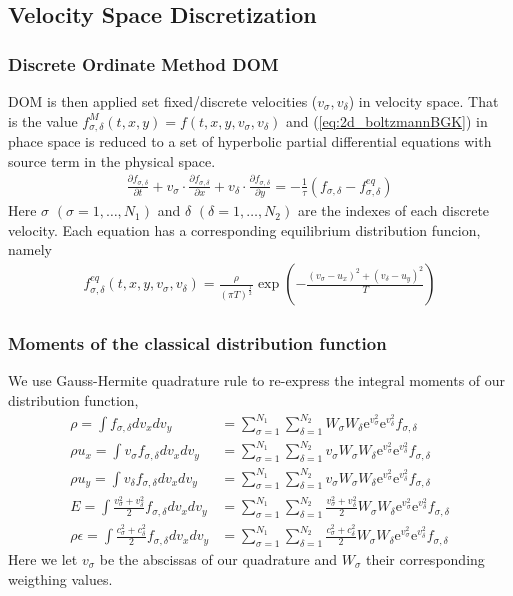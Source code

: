 \subsection{Velocity Space Discretization}
\begin{frame} \frametitle{Discrete Ordinate Method DOM}
	DOM is then applied set fixed/discrete velocities ($v_\sigma,v_\delta$) in velocity space. That is the value $f_{\sigma,\delta}^{M}(t,x,y) = f(t,x,y,v_\sigma,v_\delta)$ and (\ref{eq:2d_boltzmannBGK}) in phace space is reduced to a set of hyperbolic partial differential equations with source term in the physical space.
	\begin{align}
		\frac{\partial{f_{\sigma,\delta}}}{\partial{t}} +
		v_{\sigma}\cdot\frac{\partial{f_{\sigma,\delta}}}{\partial x} +
		v_{\delta}\cdot\frac{\partial{f_{\sigma,\delta}}}{\partial y} = 
		-\frac{1}{\tau}(f_{\sigma,\delta}-f^{eq}_{\sigma,\delta})
	\end{align}
Here $\sigma$ $(\sigma = 1,\dots,N_{1})$ and $\delta$ $(\delta = 1,\dots,N_{2})$ are the indexes of each discrete velocity. Each equation has a corresponding equilibrium distribution funcion, namely
	\begin{align}
		f_{\sigma,\delta}^{eq}(t,x,y,v_\sigma,v_\delta) = 
		\frac{\rho}{(\pi T)^{\frac{1}{2}}} \exp\left({-\frac{(v_{\sigma}-u_x)^2+(v_{\delta}-u_y)^2}{T}} \right)
	\end{align}
\end{frame}

\begin{frame}
	\frametitle{Moments of the classical distribution function}
	We use Gauss-Hermite quadrature rule to re-express the integral moments of our distribution function,
	\begin{subequations}
		\begin{align}
		\rho = \int f_{\sigma,\delta} dv_x dv_y 
				&= \sum_{\sigma=1}^{N_1} \sum_{\delta=1}^{N_2} W_\sigma W_\delta \mathrm{e}^{v_\sigma^2} \mathrm{e}^{v_\delta^2} f_{\sigma,\delta}\\
		\rho u_x = \int v_\sigma f_{\sigma,\delta} dv_x dv_y 
				&= \sum_{\sigma=1}^{N_1} \sum_{\delta=1}^{N_2} v_\sigma W_\sigma W_\delta \mathrm{e}^{v_\sigma^2} \mathrm{e}^{v_\delta^2} f_{\sigma,\delta}\\
		\rho u_y = \int v_\delta f_{\sigma,\delta} dv_x dv_y 
				&= \sum_{\sigma=1}^{N_1} \sum_{\delta=1}^{N_2} v_\sigma W_\sigma W_\delta \mathrm{e}^{v_\sigma^2} \mathrm{e}^{v_\delta^2} f_{\sigma,\delta}\\
		E = \int \frac{v_\sigma^2+v_\delta^2}{2} f_{\sigma,\delta} dv_x dv_y 
				&= \sum_{\sigma=1}^{N_1} \sum_{\delta=1}^{N_2} \frac{v_\sigma^2+v_\delta^2}{2} W_\sigma W_\delta \mathrm{e}^{v_\sigma^2} \mathrm{e}^{v_\delta^2} f_{\sigma,\delta}\\
		\rho \epsilon = \int \frac{c_\sigma^2+c_\delta^2}{2} f_{\sigma,\delta} dv_x dv_y 
				&= \sum_{\sigma=1}^{N_1} \sum_{\delta=1}^{N_2} \frac{c_\sigma^2+c_\delta^2}{2} W_\sigma W_\delta \mathrm{e}^{v_\sigma^2} \mathrm{e}^{v_\delta^2} f_{\sigma,\delta}
		\end{align}
	\end{subequations}
	Here we let $v_\sigma$ be the abscissas of our quadrature and $W_\sigma$ their corresponding weigthing values. 
\end{frame} 